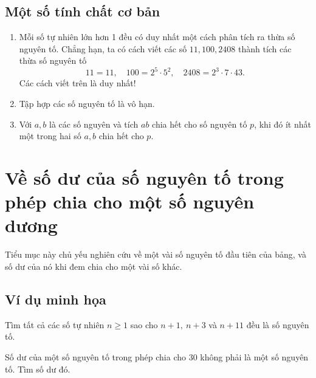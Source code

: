 \subsection{Một số tính chất cơ bản}
\begin{enumerate}
    \item Mỗi số tự nhiên lớn hơn 1 đều có duy nhất một cách phân tích ra thừa số nguyên tố. Chẳng hạn, ta có cách viết các số $11,100,2408$ thành tích các thừa số nguyên tố\[11=11,\quad 100=2^5\cdot 5^2,\quad 2408=2^3\cdot 7\cdot 43.\]Các cách viết trên là duy nhất!
    \item Tập hợp các số nguyên tố là vô hạn.
    \item Với $a,b$ là các số nguyên và tích $ab$ chia hết cho số nguyên tố $p$, khi đó ít nhất một trong hai số $a,b$ chia hết cho $p.$
\end{enumerate}

\section{Về số dư của số nguyên tố trong phép chia cho một số nguyên dương}
\setcounter{bx}{0}
Tiểu mục này chủ yếu nghiên cứu về một vài số nguyên tố đầu tiên của bảng, và số dư của nó khi đem chia cho một vài số khác.
\subsection{Ví dụ minh họa}

\begin{bx}
Tìm tất cả các số tự nhiên $n\ge 1$ sao cho $n+1,\:n+3$ và $n+11$ đều là số nguyên tố.
\end{bx}

\begin{bx}
Số dư của một số nguyên tố trong phép chia cho $30$ không phải là một số nguyên tố. Tìm số dư đó.
\end{bx}

